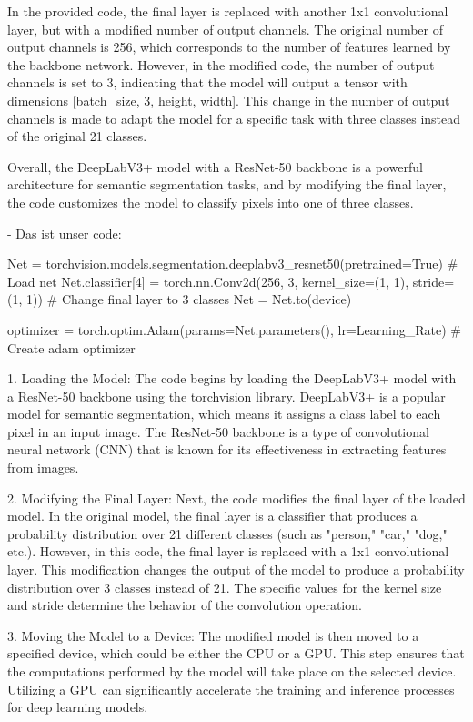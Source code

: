In the provided code, the final layer is replaced with another 1x1 convolutional layer, but with a modified number of output channels. The original number of output channels is 256, which corresponds to the number of features learned by the backbone network. However, in the modified code, the number of output channels is set to 3, indicating that the model will output a tensor with dimensions [batch_size, 3, height, width]. This change in the number of output channels is made to adapt the model for a specific task with three classes instead of the original 21 classes.

Overall, the DeepLabV3+ model with a ResNet-50 backbone is a powerful architecture for semantic segmentation tasks, and by modifying the final layer, the code customizes the model to classify pixels into one of three classes.


- Das ist unser code:

Net = torchvision.models.segmentation.deeplabv3_resnet50(pretrained=True)  # Load net
Net.classifier[4] = torch.nn.Conv2d(256, 3, kernel_size=(1, 1), stride=(1, 1))  # Change final layer to 3 classes
Net = Net.to(device)

optimizer = torch.optim.Adam(params=Net.parameters(), lr=Learning_Rate)  # Create adam optimizer


1. Loading the Model:
The code begins by loading the DeepLabV3+ model with a ResNet-50 backbone using the torchvision library. DeepLabV3+ is a popular model for semantic segmentation, which means it assigns a class label to each pixel in an input image. The ResNet-50 backbone is a type of convolutional neural network (CNN) that is known for its effectiveness in extracting features from images.

2. Modifying the Final Layer:
Next, the code modifies the final layer of the loaded model. In the original model, the final layer is a classifier that produces a probability distribution over 21 different classes (such as "person," "car," "dog," etc.). However, in this code, the final layer is replaced with a 1x1 convolutional layer. This modification changes the output of the model to produce a probability distribution over 3 classes instead of 21. The specific values for the kernel size and stride determine the behavior of the convolution operation.

3. Moving the Model to a Device:
The modified model is then moved to a specified device, which could be either the CPU or a GPU. This step ensures that the computations performed by the model will take place on the selected device. Utilizing a GPU can significantly accelerate the training and inference processes for deep learning models.

